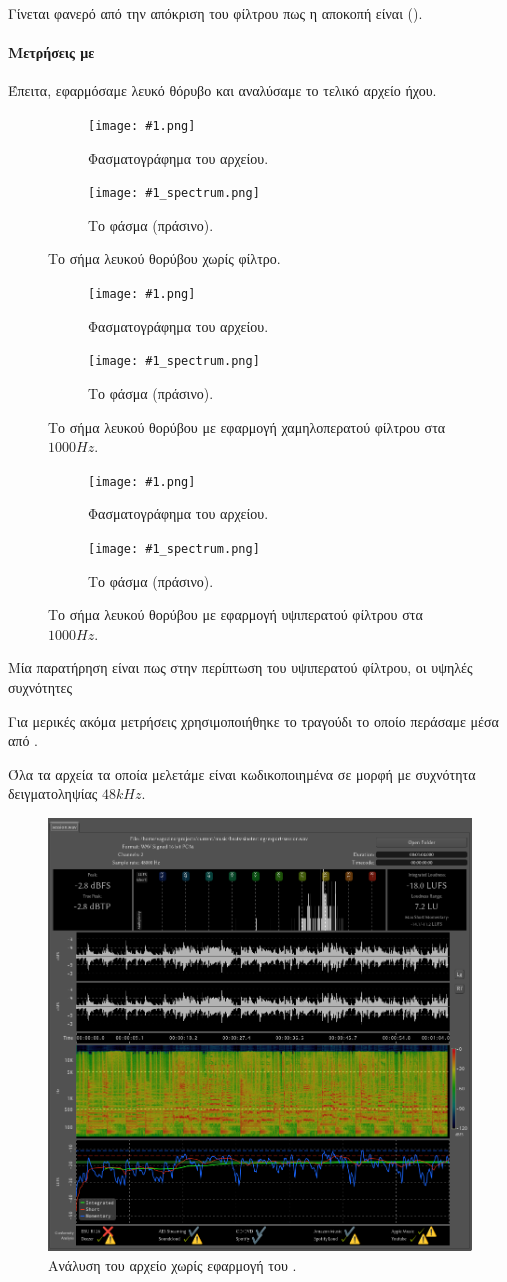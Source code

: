 \documentclass{article}
\newcommand{\filterspectrums}[2]
{
\begin{figure}
     \centering
     \begin{subfigure}[b]{\textwidth}
         \centering
         \texttt{[image: \#1.png]}
         \caption{Φασματογράφημα του αρχείου.}
     \end{subfigure}
     \hfill
     \begin{subfigure}[b]{\textwidth}
         \centering
         \texttt{[image: \#1\_spectrum.png]}
         \caption{Το φάσμα (πράσινο).}
     \end{subfigure}
     \hfill
        \caption{#2}
\end{figure}
}
\begin{document}
Γίνεται φανερό από την απόκριση του φίλτρου πως η αποκοπή 
είναι  (). 

\paragraph{Μετρήσεις με }
Έπειτα, εφαρμόσαμε λευκό θόρυβο και αναλύσαμε το τελικό αρχείο ήχου.

\filterspectrums{./assets/WhiteNoise}{Το σήμα λευκού θορύβου χωρίς φίλτρο.}
\filterspectrums{./assets/WhiteNoiseLP}{Το σήμα λευκού θορύβου με εφαρμογή χαμηλοπερατού φίλτρου στα $1000Hz$.}
\filterspectrums{./assets/WhiteNoiseHP}{Το σήμα λευκού θορύβου με εφαρμογή υψιπερατού φίλτρου στα $1000Hz$.}

Μία παρατήρηση είναι πως στην περίπτωση του υψιπερατού φίλτρου, οι υψηλές συχνότητες 

Για μερικές ακόμα μετρήσεις χρησιμοποιήθηκε το τραγούδι  
το οποίο περάσαμε μέσα από . 

Όλα τα αρχεία τα οποία μελετάμε είναι κωδικοποιημένα σε μορφή  με συχνότητα δειγματοληψίας $48kHz$.

\begin{figure}[htpb]
    \centering
    \includegraphics[width=\textwidth]{./assets/session.png}
    \caption{Ανάλυση του αρχείο  χωρίς εφαρμογή του .}
    \label{fig:sessionanalysis}
\end{figure}
\end{document}
